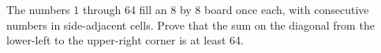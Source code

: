The numbers 1 through 64 fill an 8 by 8 board once each, with consecutive numbers in side-adjacent cells. Prove that the sum on the diagonal from the lower-left to the upper-right corner is at least 64.
